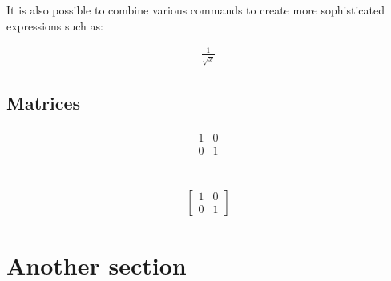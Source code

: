 \documentclass{article}
\begin{document}
 
It is also possible to combine various 
commands to create more sophisticated expressions such as:

\begin{align*}
    \frac{1}{\sqrt{x}}
  \end{align*}

\subsection{Matrices}
\begin{align*}
\begin{matrix}
    1 & 0\\
    0 & 1
\end{matrix}
\end{align*}



\begin{align*}
[
    \begin{matrix}
1 & 0\\
0 & 1
\end{matrix}
]
\end{align*}



\begin{align*}
    \left[
        \begin{matrix}
    1 & 0\\
    0 & 1
    \end{matrix}
    \right]
    \end{align*}
\section{Another section}
\end{document}
